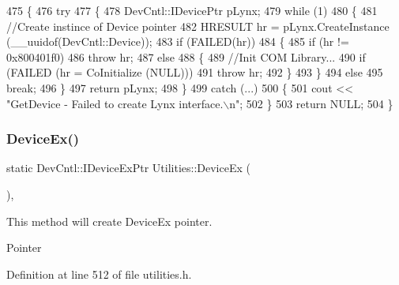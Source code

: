 \begin{DoxyCode}
475     \{
476         \textcolor{keywordflow}{try}
477         \{
478             DevCntl::IDevicePtr pLynx;
479             \textcolor{keywordflow}{while} (1)
480             \{
481                 \textcolor{comment}{//Create instince of Device pointer}
482                 HRESULT hr = pLynx.CreateInstance (\_\_uuidof(DevCntl::Device));
483                 \textcolor{keywordflow}{if} (FAILED(hr))
484                 \{
485                     \textcolor{keywordflow}{if} (hr != 0x800401f0)
486                         \textcolor{keywordflow}{throw} hr;
487                     \textcolor{keywordflow}{else}
488                     \{
489                         \textcolor{comment}{//Init COM Library...}
490                         \textcolor{keywordflow}{if} (FAILED (hr = CoInitialize (NULL)))
491                             \textcolor{keywordflow}{throw} hr;
492                     \}
493                 \}
494                 \textcolor{keywordflow}{else}
495                     \textcolor{keywordflow}{break};
496             \}
497             \textcolor{keywordflow}{return} pLynx;
498         \}
499         \textcolor{keywordflow}{catch} (...)
500         \{
501             cout << \textcolor{stringliteral}{"GetDevice - Failed to create Lynx interface.\(\backslash\)n"};
502         \}
503         \textcolor{keywordflow}{return} NULL;
504     \}
\end{DoxyCode}
\mbox{\label{class_utilities_aeb1fd9dbe82fb50e1abaf8e98c225f3a_aeb1fd9dbe82fb50e1abaf8e98c225f3a}} 
\subsubsection{\texorpdfstring{Device\+Ex()}{DeviceEx()}}
{\footnotesize\ttfamily static Dev\+Cntl\+::\+I\+Device\+Ex\+Ptr Utilities\+::\+Device\+Ex (\begin{DoxyParamCaption}{ }\end{DoxyParamCaption})\hspace{0.3cm}{\ttfamily [inline]}, {\ttfamily [static]}}

This method will create Device\+Ex pointer.

Pointer 

Definition at line 512 of file utilities.\+h.


